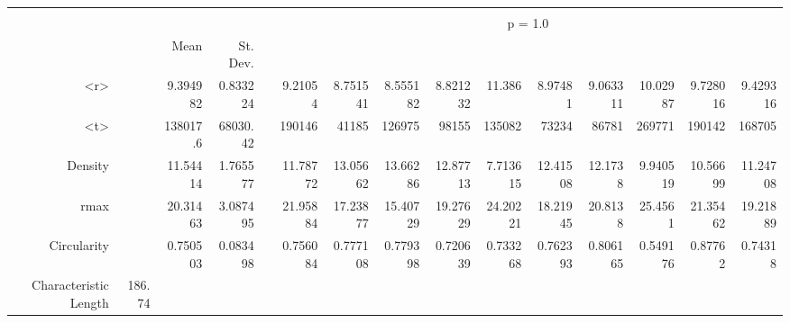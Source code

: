 \begin{table}[htbp]
\begin{tabular}{rrrrrrrrrrrrrrr}
          &       &       &       &       &       &       &       &       &       &       &       &       &       &  \\
          &       &       &       &       & \multicolumn{10}{c}{p = 1.0} \\
          &       & Mean  & St. Dev. &       &       &       &       &       &       &       &       &       &       &  \\
    <r>   &       & 9.394982 & 0.833224 &       & 9.21054 & 8.751541 & 8.555182 & 8.821232 & 11.386 & 8.97481 & 9.063311 & 10.02987 & 9.728016 & 9.429316 \\
    <t>   &       & 138017.6 & 68030.42 &       & 190146 & 41185 & 126975 & 98155 & 135082 & 73234 & 86781 & 269771 & 190142 & 168705 \\
    Density &       & 11.54414 & 1.765577 &       & 11.78772 & 13.05662 & 13.66286 & 12.87713 & 7.713615 & 12.41508 & 12.1738 & 9.940519 & 10.56699 & 11.24708 \\
    rmax  &       & 20.31463 & 3.087495 &       & 21.95884 & 17.23877 & 15.40729 & 19.27629 & 24.20221 & 18.21945 & 20.8138 & 25.4561 & 21.35462 & 19.21889 \\
    Circularity &       & 0.750503 & 0.083498 &       & 0.756084 & 0.777108 & 0.779398 & 0.720639 & 0.733268 & 0.762393 & 0.806165 & 0.549176 & 0.87762 & 0.74318 \\
    Characteristic Length & 186.74 &       &       &       &       &       &       &       &       &       &       &       &       &  \\
    \bottomrule
    \end{tabular}%
  \label{tab:addlabel}%
\end{table}%

